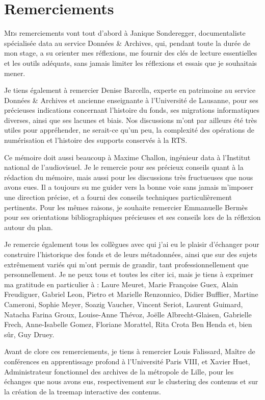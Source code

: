 \documentclass[a4paper,12pt,twoside]{book}
\begin{document}
	\chapter{Remerciements}
	
	\lettrine{M}es remerciements vont tout d’abord à Janique Sonderegger, documentaliste spécialisée data au service Données \& Archives, qui, pendant toute la durée de mon stage, a su orienter mes réflexions, me fournir des clés de lecture essentielles et les outils adéquats, sans jamais limiter les réflexions et essais que je souhaitais mener.
	
	Je tiens également à remercier Denise Barcella, experte en patrimoine au service Données \& Archives et ancienne enseignante à l’Université de Lausanne, pour ses précieuses indications concernant l’histoire du fonds, ses migrations informatiques diverses, ainsi que ses lacunes et biais. Nos discussions m’ont par ailleurs été très utiles pour appréhender, ne serait-ce qu’un peu, la complexité des opérations de numérisation et l’histoire des supports conservés à la RTS.
	
	Ce mémoire doit aussi beaucoup à Maxime Challon, ingénieur data à l’Institut national de l’audiovisuel. Je le remercie pour ses précieux conseils quant à la rédaction du mémoire, mais aussi pour les discussions très fructueuses que nous avons eues. Il a toujours su me guider vers la bonne voie sans jamais m’imposer une direction précise, et a fourni des conseils techniques particulièrement pertinents. Pour les mêmes raisons, je souhaite remercier Emmanuelle Bermès pour ses orientations bibliographiques précieuses et ses conseils lors de la réflexion autour du plan.
	
	Je remercie également tous les collègues avec qui j’ai eu le plaisir d’échanger pour construire l’historique des fonds et de leurs métadonnées, ainsi que sur des sujets extrêmement variés qui m’ont permis de grandir, tant professionnellement que personnellement. Je ne peux tous et toutes les citer ici, mais je tiens à exprimer ma gratitude en particulier à : Laure Meuret, Marie Françoise Guex, Alain Freudiguer, Gabriel Leon, Pietro et Marielle Renzonnico, Didier Bufflier, Martine Cameroni, Sophie Meyer, Soazig Vaucher, Vincent Seriot, Laurent Guimard, Natacha Farina Groux, Louise-Anne Thévoz, Joëlle Albrecht-Glaisen, Gabrielle Frech, Anne-Isabelle Gomez, Floriane Morattel, Rita Crota Ben Henda et, bien sûr, Guy Druey.
	
	Avant de clore ces remerciements, je tiens à remercier Louis Falissard, Maître de conférences en apprentissage profond à l’Université Paris VIII, et Xavier Huet, Administrateur fonctionnel des archives de la métropole de Lille, pour les échanges que nous avons eus, respectivement sur le clustering des contenus et sur la création de la treemap interactive des contenus.
	
\end{document}
